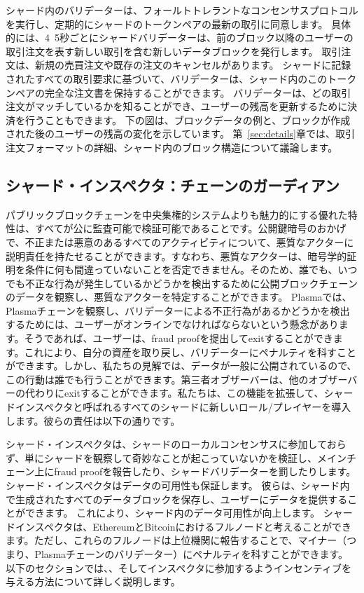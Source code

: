 シャード内のバリデーターは、フォールトトレラントなコンセンサスプロトコルを実行し、定期的にシャードのトークンペアの最新の取引に同意します。 具体的には、4~5秒ごとにシャードバリデーターは、前のブロック以降のユーザーの取引注文を表す新しい取引を含む新しいデータブロックを発行します。 取引注文は、新規の売買注文や既存の注文のキャンセルがあります。 シャードに記録されたすべての取引要求に基づいて、バリデーターは、シャード内のこのトークンペアの完全な注文書を保持することができます。 バリデーターは、どの取引注文がマッチしているかを知ることができ、ユーザーの残高を更新するために決済を行うこともできます。 下の図は、ブロックデータの例と、ブロックが作成された後のユーザーの残高の変化を示しています。 第~\ref{sec:details}章では、取引注文フォーマットの詳細、シャード内のブロック構造について議論します。

\subsection{シャード・インスペクタ：チェーンのガーディアン}

パブリックブロックチェーンを中央集権的システムよりも魅力的にする優れた特性は、すべてが公に監査可能で検証可能であることです。公開鍵暗号のおかげで、不正または悪意のあるすべてのアクティビティについて、悪質なアクターに説明責任を持たせることができます。すなわち、悪質なアクターは、暗号学的証明を条件に何も間違っていないことを否定できません。そのため、誰でも、いつでも不正な行為が発生しているかどうかを検出するために公開ブロックチェーンのデータを観察し、悪質なアクターを特定することができます。 Plasmaでは、Plasmaチェーンを観察し、バリデーターによる不正行為があるかどうかを検出するためには、ユーザーがオンラインでなければならないという懸念があります。そうであれば、ユーザーは、fraud proofを提出してexitすることができます。これにより、自分の資産を取り戻し、バリデーターにペナルティを科すことができます。しかし、私たちの見解では、データが一般に公開されているので、この行動は誰でも行うことができます。第三者オブザーバーは、他のオブザーバーの代わりにexitすることができます。私たちは、この機能を拡張して、シャー​​ドインスペクタと呼ばれるすべてのシャードに新しいロール/プレイヤーを導入します。彼らの責任は以下の通りです。

シャード・インスペクタは、シャードのローカルコンセンサスに参加しておらず、単にシャードを観察して奇妙なことが起こっていないかを検証し、メインチェーン上にfraud proofを報告したり、シャードバリデーターを罰したりします。 シャード・インスペクタはデータの可用性も保証します。 彼らは、シャード内で生成されたすべてのデータブロックを保存し、ユーザーにデータを提供することができます。 これにより、シャード内のデータ可用性が向上します。 シャードインスペクタは、EthereumとBitcoinにおけるフルノードと考えることができます。ただし、これらのフルノードは上位機関に報告することで、マイナー（つまり、Plasmaチェーンのバリデーター）にペナルティを科すことができます。 以下のセクションでは、、そしてインスペクタに参加するようインセンティブを与える方法について詳しく説明します。


